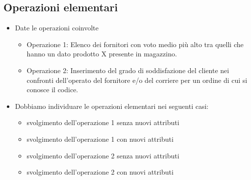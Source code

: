 \subsection{Operazioni elementari}
\begin{itemize}
	\item Date le operazioni coinvolte
	\begin{itemize}
		\item Operazione 1: Elenco dei fornitori con voto medio più alto tra quelli che hanno un dato prodotto X presente in magazzino. 
		\item Operazione 2: Inserimento del grado di soddisfazione del cliente nei confronti dell’operato del fornitore e/o del corriere per un ordine di cui si conosce il codice. 
	\end{itemize}
	\item Dobbiamo individuare le operazioni elementari nei seguenti casi:
	\begin{itemize}
		\item svolgimento dell’operazione 1 senza nuovi attributi
		\item svolgimento dell’operazione 1 con nuovi attributi
		\item svolgimento dell’operazione 2 senza nuovi attributi
		\item svolgimento dell’operazione 2 con nuovi attributi
	\end{itemize}
	

\end{itemize}
